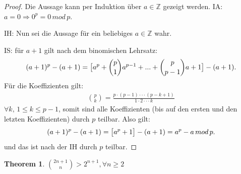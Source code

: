 \documentclass[12pt,oneside]{article}
\newtheorem{theorem}{Theorem}[section]
\theoremstyle{remark}
\theoremstyle{definition}
\begin{document}
\begin{proof}
Die Aussage kann per Induktion über $a \in \mathbb{Z}$ gezeigt werden.\newline\newline
IA: $a = 0  \Rightarrow 0^p = 0 \, mod \, p$.\newline\newline

IH: Nun sei die Aussage für ein beliebiges $a \in \mathbb{Z}$ wahr.\newline\newline

IS: für $a + 1$ gilt nach dem binomischen Lehrsatz:
\begin{align*}
    (a + 1)^p - (a + 1) = \big{[}a^p + {p \choose 1}a^{p - 1} + ... +{p \choose p - 1} a + 1\big{]} - (a + 1).
\end{align*}
Für die Koeffizienten gilt: 
\begin{align*}
    {p \choose k} = \frac{p \cdot (p - 1) \cdot \cdot \cdot (p - k + 1)}{1 \cdot 2 \cdot \cdot \cdot k}
\end{align*}
$\forall k, \,  1 \leq k \leq p - 1$, somit sind alle Koeffizienten (bis auf den ersten und den letzten Koeffizienten) durch $p$ teilbar.\newline\newline
Also gilt:
\begin{align*}
(a + 1)^p - (a + 1) = \big{[} a^p + 1 \big{]} - (a + 1) = a^p - a \, mod \, p.
\end{align*}
und das ist nach der IH durch $p$ teilbar.\newline  
\end{proof}

\smallskip

\begin{theorem}\label{useful_theorem_for_proof}
${2n + 1 \choose n} > 2^{n+1}, \forall n \geq 2$
\end{theorem}
\end{document}
